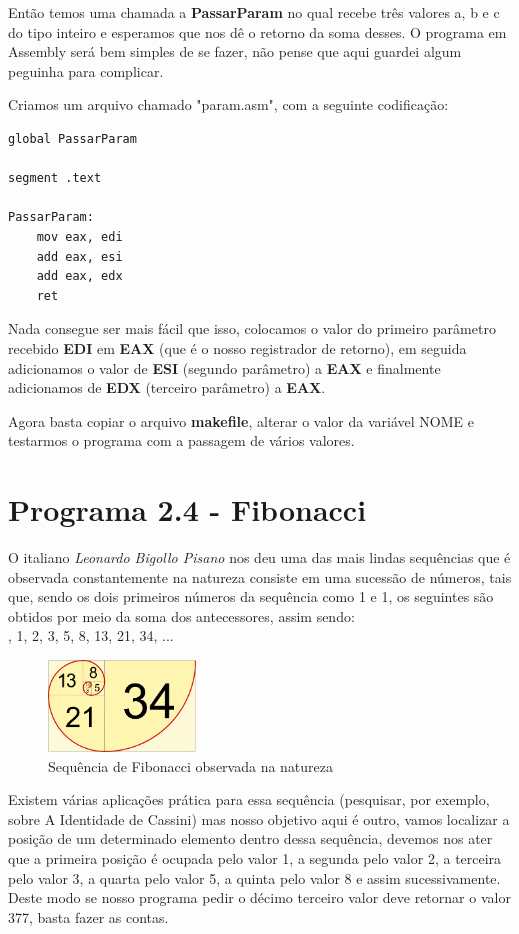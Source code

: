 Então temos uma chamada a \textbf{PassarParam} no qual recebe três valores a, b e c do tipo inteiro e esperamos que nos dê o retorno da soma desses. O programa em Assembly será bem simples de se fazer, não pense que aqui guardei algum peguinha para complicar.

Criamos um arquivo chamado "param.asm", com a seguinte codificação:
\begin{lstlisting}[]
global PassarParam

segment .text

PassarParam:
	mov eax, edi
	add eax, esi
	add eax, edx
	ret
\end{lstlisting}

Nada consegue ser mais fácil que isso, colocamos o valor do primeiro parâmetro recebido \textbf{EDI} em \textbf{EAX} (que é o nosso registrador de retorno), em seguida adicionamos o valor de \textbf{ESI} (segundo parâmetro) a \textbf{EAX} e finalmente adicionamos de \textbf{EDX} (terceiro parâmetro) a \textbf{EAX}.

Agora basta copiar o arquivo \textbf{makefile}, alterar o valor da variável NOME e testarmos o programa com a passagem de vários valores.

\section{Programa 2.4 - Fibonacci}
O italiano \textit{Leonardo Bigollo Pisano} nos deu uma das mais lindas sequências que é observada constantemente na natureza consiste em uma sucessão de números, tais que, sendo os dois primeiros números da sequência como 1 e 1, os seguintes são obtidos por meio da soma dos antecessores, assim sendo: \\
{, 1, 2, 3, 5, 8, 13, 21, 34, ...}
\begin{figure}[H]
	\centering
	\includegraphics[width=0.35\textwidth]{Pictures/cap02/fibonacci}
	\caption{Sequência de Fibonacci observada na natureza}
\end{figure}

Existem várias aplicações prática para essa sequência (pesquisar, por exemplo, sobre A Identidade de Cassini) mas nosso objetivo aqui é outro, vamos localizar a posição de um determinado elemento dentro dessa sequência, devemos nos ater que a primeira posição é ocupada pelo valor 1, a segunda pelo valor 2, a terceira pelo valor 3, a quarta pelo valor 5, a quinta pelo valor 8 e assim sucessivamente. Deste modo se nosso programa pedir o décimo terceiro valor deve retornar o valor 377, basta fazer as contas.

